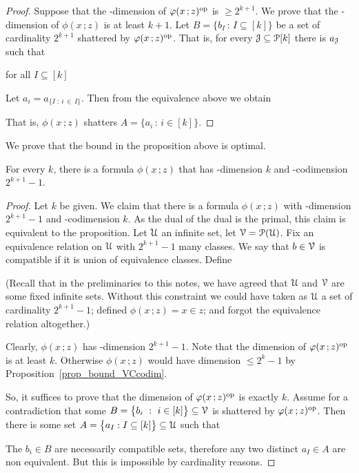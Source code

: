 \documentclass[scombinatorics.tex]{subfiles}
\begin{document}
\begin{proof}
  Suppose that the \vc-dimension of $\phi(x\,;z)^{\rm op}$ is $\ge 2^{k+1}$.
  We prove that the \vc-dimension of $\phi(x\,;z)$ is at least $k+1$.
  Let $B=\big\{b_I\,:\,I\subseteq [k]\big\}$ be a set of cardinality $2^{k+1}$ shattered by $\phi(x\,;z)^{\rm op}$. 
  That is, for every $\J\subseteq \P[k]$ there is $a_\J$ such that
  
  \hfill for all $I\subseteq [k]$
  
  Let $a_i=a_{\{I\; :\ i\,\in\, I\}}$. Then from the equivalence above we obtain
  
  
  That is, $\phi(x\,;z)$ shatters $A=\big\{a_i\,:\, i\in [k]\big\}$.
\end{proof}

We prove that the bound in the proposition above is optimal.

\begin{proposition}
  For every $k$, there is a formula $\phi(x\,;z)$ that has \vc-dimension $k$ and \vc-codimension $2^{k+1}-1$.
\end{proposition}
\begin{proof}
  Let $k$ be given.
  We claim that there is a formula $\phi(x\,;z)$ with \vc-dimension $2^{k+1}-1$ and \vc-codimension $k$.
  As the dual of the dual is the primal, this claim is equivalent to the proposition.
  Let $\U$ an infinite set, let $\V=\P(\U)$.
  Fix an equivalence relation on $\U$ with $2^{k+1}-1$ many classes.
  We say that $b\in\V$ is compatible if it is union of equivalence classes.
  Define
  
  
  (Recall that in the preliminaries to this notes, we have agreed that $\U$ and $\V$ are some fixed infinite sets. Without this constraint we could have taken as $\U$ a set of cardinality $2^{k+1}-1$; defined $\phi(x\,;z)=x\in z$; and forgot the equivalence relation altogether.)

  Clearly, $\phi(x\,;z)$ has \vc-dimension $2^{k+1}-1$.
  Note that the dimension of $\phi(x\,;z)^{\rm op}$ is at least $k$.
  Otherwise $\phi(x\,;z)$ would have dimension $\le2^k-1$ by Proposition~\ref{prop_bound_VCcodim}.
  
  So, it suffices to prove that the dimension of $\phi(x\,;z)^{\rm op}$ is exactly $k$.
  Assume for a contradiction that some $B=\big\{b_i\ :\ i\in[k]\big\}\subseteq\V$ is shattered by $\phi(x\,;z)^{\rm op}$.
  Then there is some set $A=\big\{a_I:I\subseteq[k]\big\}\subseteq\U$ such that
  

  The $b_i\in B$ are necessarily compatible sets, therefore any two distinct $a_I\in A$ are non equivalent.
  But this is impossible by cardinality reasons.
\end{proof}
\end{document}
